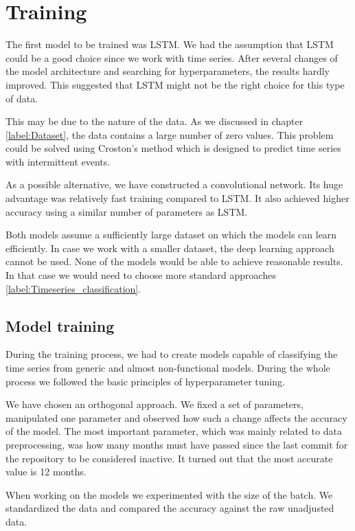 \documentclass[thesis=M,english]{FITthesis}[2019/12/23]
\begin{document}
\section{Training}
\label{label:training}
The first model to be trained was LSTM. We had the assumption that LSTM could be a good choice since we work with time series. After several changes of the model architecture and searching for hyperparameters, the results hardly improved. This suggested that LSTM might not be the right choice for this type of data.

This may be due to the nature of the data. As we discussed in chapter \ref{label:Dataset}, the data contains a large number of zero values. This problem could be solved using Croston's method which is designed to predict time series with intermittent events. 

As a possible alternative, we have constructed a convolutional network. Its huge advantage was relatively fast training compared to LSTM. It also achieved higher accuracy using a similar number of parameters as LSTM.


Both models assume a sufficiently large dataset on which the models can learn efficiently. 
In case we work with a smaller dataset, the deep learning approach cannot be used. None of the models would be able to achieve reasonable results. In that case we would need to choose more standard approaches \ref{label:Timeseries_classification}.

\subsection{Model training}

During the training process, we had to create models capable of classifying the time series from generic and almost non-functional models. During the whole process we followed the basic principles of hyperparameter tuning.

We have chosen an orthogonal approach. We fixed a set of parameters, manipulated one parameter and observed how such a change affects the accuracy of the model. The most important parameter, which was mainly related to data preprocessing, was how many months must have passed since the last commit for the repository to be considered inactive. It turned out that the most accurate value is 12 months.

When working on the models we experimented with the size of the batch. We standardized the data and compared the accuracy against the raw unadjusted data. 
\end{document}
